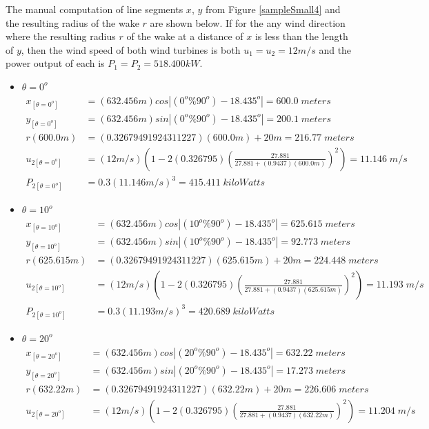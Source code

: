     The manual computation of line segments $x$, $y$ from Figure \ref{sampleSmall4} and the resulting radius of the wake $r$ are shown below. If for the any wind direction where the resulting radius $r$ of the wake at a distance of $x$ is less than the length of $y$, then the wind speed of both wind turbines is both $u_1=u_2=12m/s$ and the power output of each is $P_1=P_2=518.400kW$.
    \begin{itemize}
\item $\theta=0^o$
	\begin{align*}%
		x_{[\theta=0^o]} &=(632.456m) cos\left| (0^o\%90^o) - 18.435^o \right|  =600.0\;meters \\
		y_{[\theta=0^o]} &=(632.456m) sin\left| (0^o\%90^o) - 18.435^o \right|  =200.1\;meters \\
		r(600.0m) &=(0.32679491924311227)(600.0m)+20m  =216.77\;meters\\
		u_{2[\theta=0^o]} &=(12m/s)\left( 1-2(0.326795)\left( \frac{27.881}{27.881+(0.9437)(600.0m)} \right)^2 \right) =11.146\;m/s \\
		P_{2[\theta=0^o]} &=0.3(11.146m/s)^3  =415.411\;kiloWatts
\end{align*}
\item $\theta=10^o$
	\begin{align*}%
		x_{[\theta=10^o]} &=(632.456m) cos\left| (10^o\%90^o) - 18.435^o \right|  =625.615\;meters \\
		y_{[\theta=10^o]} &=(632.456m) sin\left| (10^o\%90^o) - 18.435^o \right|  =92.773\;meters \\
		r(625.615m) &=(0.32679491924311227)(625.615m)+20m  =224.448\;meters\\
		u_{2[\theta=10^o]} &=(12m/s)\left( 1-2(0.326795)\left( \frac{27.881}{27.881+(0.9437)(625.615m)} \right)^2 \right) =11.193\;m/s \\
		P_{2[\theta=10^o]} &=0.3(11.193m/s)^3  =420.689\;kiloWatts
\end{align*}
\item $\theta=20^o$
	\begin{align*}%
		x_{[\theta=20^o]} &=(632.456m) cos\left| (20^o\%90^o) - 18.435^o \right|  =632.22\;meters \\
		y_{[\theta=20^o]} &=(632.456m) sin\left| (20^o\%90^o) - 18.435^o \right|  =17.273\;meters \\
		r(632.22m) &=(0.32679491924311227)(632.22m)+20m  =226.606\;meters\\
		u_{2[\theta=20^o]} &=(12m/s)\left( 1-2(0.326795)\left( \frac{27.881}{27.881+(0.9437)(632.22m)} \right)^2 \right) =11.204\;m/s \\

\end{align*}
\end{itemize}
